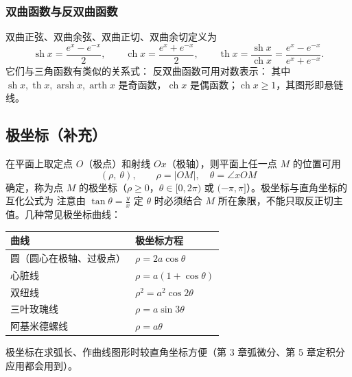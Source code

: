 \subsubsection{双曲函数与反双曲函数}
双曲正弦、双曲余弦、双曲正切、双曲余切定义为
\[
\operatorname{sh}x=\frac{e^{x}-e^{-x}}{2},\qquad
\operatorname{ch}x=\frac{e^{x}+e^{-x}}{2},\qquad
\operatorname{th}x=\frac{\operatorname{sh}x}{\operatorname{ch}x}=\frac{e^{x}-e^{-x}}{e^{x}+e^{-x}} .
\]
它们与三角函数有类似的关系式：
反双曲函数可用对数表示：
\noindent 其中 $\operatorname{sh}x,\operatorname{th}x,\operatorname{arsh}x,\operatorname{arth}x$ 是奇函数，$\operatorname{ch}x$ 是偶函数；$\operatorname{ch}x\ge1$，其图形即悬链线。

\subsection{极坐标（补充）}
在平面上取定点 $O$（极点）和射线 $Ox$（极轴），则平面上任一点 $M$ 的位置可用
\[
(\rho,\ \theta),\qquad \rho=|OM|,\quad \theta=\angle xOM
\]
确定，称为点 $M$ 的极坐标（$\rho\ge0$，$\theta\in[0,2\pi)$ 或 $(-\pi,\pi]$）。极坐标与直角坐标的互化公式为
\noindent 注意由 $\tan\theta=\frac yx$ 定 $\theta$ 时必须结合 $M$ 所在象限，不能只取反正切主值。几种常见极坐标曲线：
\begin{center}
\begin{tabular}{@{}ll@{}}
\toprule
曲线 & 极坐标方程 \\
\midrule
圆（圆心在极轴、过极点） & $\rho=2a\cos\theta$ \\
心脏线 & $\rho=a(1+\cos\theta)$ \\
双纽线 & $\rho^2=a^2\cos2\theta$ \\
三叶玫瑰线 & $\rho=a\sin3\theta$ \\
阿基米德螺线 & $\rho=a\theta$ \\
\bottomrule
\end{tabular}
\end{center}
极坐标在求弧长、作曲线图形时较直角坐标方便（第 3 章弧微分、第 5 章定积分应用都会用到）。
